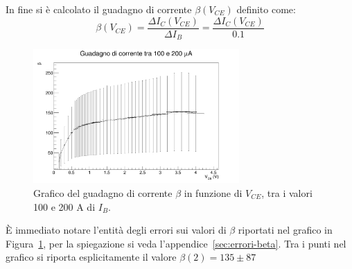 \documentclass[../main.tex]{subfiles}
\begin{document}
    In fine si è calcolato il guadagno di corrente $\beta(V_{CE})$ definito come:
    \begin{equation*}
        \beta(V_{CE}) = \frac{\varDelta I_C(V_{CE})}{\varDelta I_B} = \frac{\varDelta I_C(V_{CE})}{0.1}
    \end{equation*}

    \begin{figure}[h!]
        \centering
        \includegraphics[width=0.7\textwidth]{../../images/beta}
        \caption{
            Grafico del guadagno di corrente $\beta$ in funzione di
            $V_{CE}$, tra i valori 100 e 200 \textmu A di $I_B$.
        }
        \label{fig:beta}
    \end{figure}
    È immediato notare l'entità degli errori sui valori di $\beta$
    riportati nel grafico in Figura~\ref{fig:beta}, per la
    spiegazione si veda l'appendice~\ref{sec:errori-beta}.
    Tra i punti nel grafico si riporta esplicitamente il valore
    $\beta(2) = 135 \pm  87$
\end{document}
